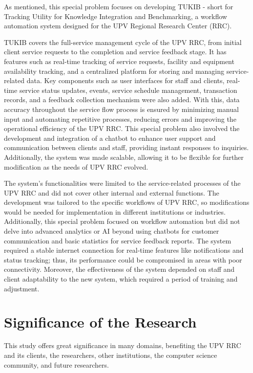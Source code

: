 As mentioned, this special problem focuses on developing TUKIB - short for Tracking Utility for Knowledge Integration and Benchmarking, a workflow automation system designed for the UPV Regional Research Center (RRC). 

TUKIB covers the full-service management cycle of the UPV RRC, from initial client service requests to the completion and service feedback stage. It has features such as real-time tracking of service requests, facility and equipment availability tracking, and a centralized platform for storing and managing service-related data. Key components such as user interfaces for staff and clients, real-time service status updates, events, service schedule management, transaction records, and a feedback collection mechanism were also added. With this, data accuracy throughout the service flow process is ensured by minimizing manual input and automating repetitive processes, reducing errors and improving the operational efficiency of the UPV RRC. This special problem also involved the development and integration of a chatbot to enhance user support and communication between clients and staff, providing instant responses to inquiries. Additionally, the system was made scalable, allowing it to be flexible for further modification as the needs of UPV RRC evolved.

The system’s functionalities were limited to the service-related processes of the UPV RRC and did not cover other internal and external functions. The development was tailored to the specific workflows of UPV RRC, so modifications would be needed for implementation in different institutions or industries. Additionally, this special problem focused on workflow automation but did not delve into advanced analytics or AI beyond using chatbots for customer communication and basic statistics for service feedback reports. The system required a stable internet connection for real-time features like notifications and status tracking; thus, its performance could be compromised in areas with poor connectivity. Moreover, the effectiveness of the system depended on staff and client adaptability to the new system, which required a period of training and adjustment.

\section{Significance of the Research}
\label{sec:significance}

This study offers great significance in many domains, benefiting the UPV RRC and its clients, the researchers, other institutions, the computer science community, and future researchers.

